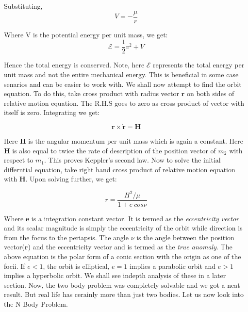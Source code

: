 \documentclass[12pt, letterpaper]{article}
\begin{document}
Substituting,
\begin{displaymath}
V = -\frac{\mu}{r}
\end{displaymath}

Where V is the potential energy per unit mass, we get:
\begin{displaymath}
\mathcal{E} = \frac{1}{2}v^2 + V
\end{displaymath}

Hence the total energy is conserved. Note, here $\mathcal{E}$ represents the total energy per unit mass and not the entire mechanical energy. This is beneficial in some case senarios and can be easier to work with. We shall now attempt to find the orbit equation. To do this, take cross product with radius vector $\mathbf{r}$ on both sides of relative motion equation. The R.H.S goes to zero as cross product of vector with itself is zero. Integrating we get:

\begin{displaymath}
\mathbf{r}\times\mathbf{\dot{r}} = \mathbf{H}
\end{displaymath}

Here \textbf{H} is the angular momentum per unit mass which is again a constant. Here \textbf{H} is also equal to twice the rate of description of the position vector of $m_2$ with respect to $m_1$. This proves Keppler's second law. Now to solve the initial differntial equation, take right hand cross product of relative motion equation with \textbf{H}. Upon solving further, we get:

\begin{displaymath}
{r} = \frac{{H^2}/\mu}{1 + e\:cos\nu}
\end{displaymath}

Where $\mathbf{e}$ is a integration constant vector. It is termed as the \textit{eccentricity vector} and its scalar magnitude is simply the eccentricity of the orbit while direction is from the focus to the periapsis. The angle $\nu$ is the angle between the position vector($\mathbf{r}$) and the eccentricity vector and is termed as the \textit{true anomaly}. The above equation is the polar form of a conic section with the origin as one of the focii. If $e < 1$, the orbit is elliptical, $e = 1$ implies a parabolic orbit and $e > 1$ implies a hyperbolic orbit. We shall see indepth analysis of these in a later section. Now, the two body problem was completely solvable and we got a neat result. But real life has cerainly more than just two bodies. Let us now look into the N Body Problem.
\end{document}
